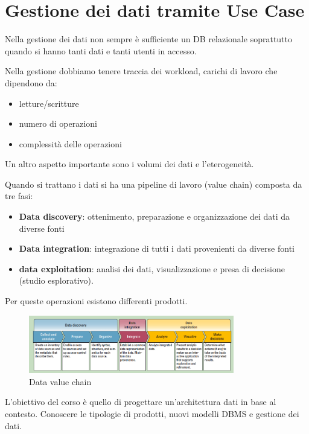 \section{Gestione dei dati tramite Use Case}
Nella gestione dei dati non sempre è sufficiente un DB relazionale soprattutto
quando si hanno tanti dati e tanti utenti in accesso.

Nella gestione dobbiamo tenere traccia dei workload, carichi di lavoro che dipendono da:
\begin{itemize}
    \item letture/scritture
    \item numero di operazioni
    \item complessità delle operazioni
\end{itemize}
Un altro aspetto importante sono i volumi dei dati e l'eterogeneità.

Quando si trattano i dati si ha una pipeline di lavoro (value chain) composta da
tre fasi:
\begin{itemize}
    \item \textbf{Data discovery}: ottenimento, preparazione e organizzazione
          dei dati da diverse fonti
    \item \textbf{Data integration}: integrazione di tutti i dati provenienti da
          diverse fonti
    \item \textbf{data exploitation}: analisi dei dati, visualizzazione e presa
          di decisione (studio esplorativo).
\end{itemize}
Per queste operazioni esistono differenti prodotti.
\begin{figure}[ht]
    \centering
    \includegraphics[width=0.8\textwidth]{./img/data_chain.png}
    \caption{Data value chain}
    \label{fig:valChain}
\end{figure}

L'obiettivo del corso è quello di progettare un'architettura dati in base al
contesto. Conoscere le tipologie di prodotti, nuovi modelli DBMS e gestione dei
dati.

